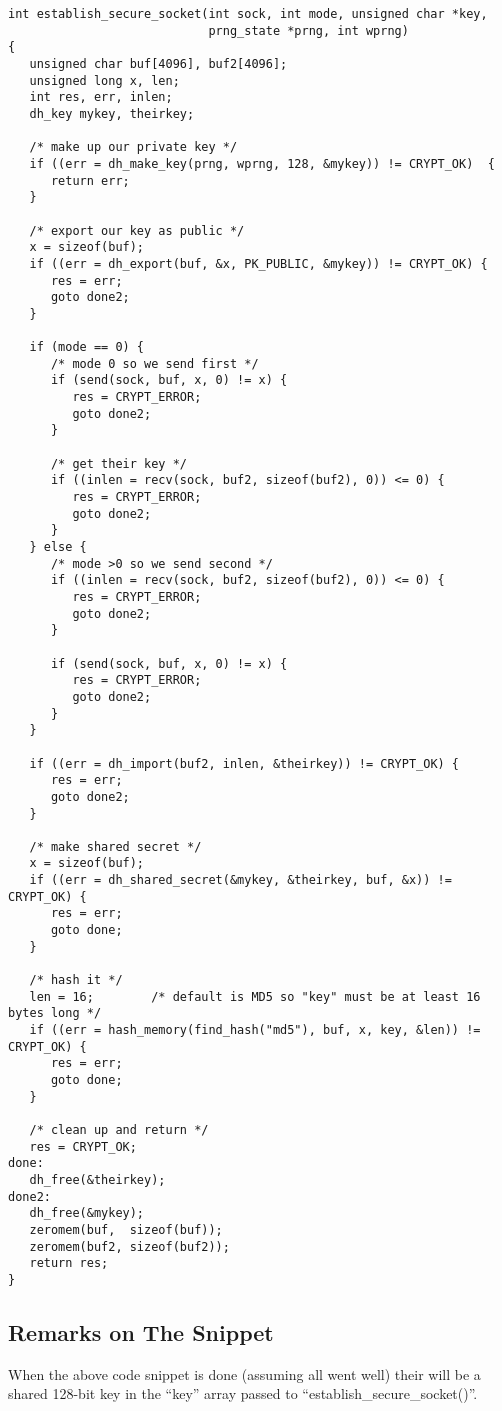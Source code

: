 \documentclass[synpaper]{book}
\begin{document}
\begin{small}
\begin{verbatim}
int establish_secure_socket(int sock, int mode, unsigned char *key,
                            prng_state *prng, int wprng)
{
   unsigned char buf[4096], buf2[4096];
   unsigned long x, len;
   int res, err, inlen;
   dh_key mykey, theirkey;

   /* make up our private key */
   if ((err = dh_make_key(prng, wprng, 128, &mykey)) != CRYPT_OK)  {
      return err;
   }

   /* export our key as public */
   x = sizeof(buf);
   if ((err = dh_export(buf, &x, PK_PUBLIC, &mykey)) != CRYPT_OK) {
      res = err;
      goto done2;
   }

   if (mode == 0) {
      /* mode 0 so we send first */
      if (send(sock, buf, x, 0) != x) {
         res = CRYPT_ERROR;
         goto done2;
      }

      /* get their key */
      if ((inlen = recv(sock, buf2, sizeof(buf2), 0)) <= 0) {
         res = CRYPT_ERROR;
         goto done2;
      }
   } else {
      /* mode >0 so we send second */
      if ((inlen = recv(sock, buf2, sizeof(buf2), 0)) <= 0) {
         res = CRYPT_ERROR;
         goto done2;
      }

      if (send(sock, buf, x, 0) != x) {
         res = CRYPT_ERROR;
         goto done2;
      }
   }

   if ((err = dh_import(buf2, inlen, &theirkey)) != CRYPT_OK) {
      res = err;
      goto done2;
   }

   /* make shared secret */
   x = sizeof(buf);
   if ((err = dh_shared_secret(&mykey, &theirkey, buf, &x)) != CRYPT_OK) {
      res = err;
      goto done;
   }

   /* hash it */
   len = 16;        /* default is MD5 so "key" must be at least 16 bytes long */
   if ((err = hash_memory(find_hash("md5"), buf, x, key, &len)) != CRYPT_OK) {
      res = err;
      goto done;
   }

   /* clean up and return */
   res = CRYPT_OK;
done:
   dh_free(&theirkey);
done2:
   dh_free(&mykey);
   zeromem(buf,  sizeof(buf));
   zeromem(buf2, sizeof(buf2));
   return res;
}
\end{verbatim}
\end{small}
\newpage
\subsection{Remarks on The Snippet}
When the above code snippet is done (assuming all went well) their will be a shared 128-bit key in the ``key'' array
passed to ``establish\_secure\_socket()''.
\end{document}
